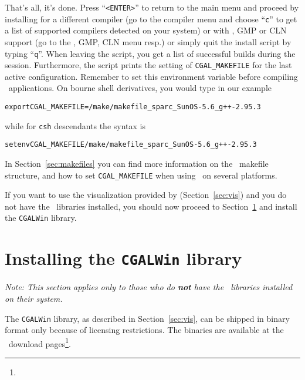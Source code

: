 That's all, it's done. Press ``\texttt{<ENTER>}'' to return to the
main menu and proceed by installing for a different compiler (go to
the compiler menu and choose ``\texttt{c}'' to get a list of supported
compilers detected on your system) or with \leda, GMP or CLN support
(go to the \leda, GMP, CLN menu resp.) or simply quit the install
script by typing ``\texttt{q}''. When leaving the script, you get a
list of successful builds during the session. Furthermore, the script
prints the setting of \texttt{CGAL\_MAKEFILE} for the last active
configuration. Remember to set this environment variable before
compiling \cgal\ applications. On bourne shell derivatives, you would
type in our example
\begin{alltt}
      export CGAL_MAKEFILE=\cgaldir/make/makefile_sparc_SunOS-5.6_g++-2.95.3
\end{alltt}
while for \texttt{csh} descendants the syntax is
\begin{alltt}
      setenv CGAL_MAKEFILE \cgaldir/make/makefile_sparc_SunOS-5.6_g++-2.95.3
\end{alltt}
In Section~\ref{sec:makefiles} you can find more information on the
\cgal\ makefile structure, and how to set \texttt{CGAL\_MAKEFILE} when
using \cgal\ on several platforms.

If you want to use the visualization provided by
 (Section~\ref{sec:vis}) and you do not have
the \leda\ libraries installed, you should now proceed to
Section~\ref{sec:cgalwin} and install the \texttt{CGALWin} library.


\section{Installing the \texttt{CGALWin} library}\label{sec:cgalwin}

\textit{Note: This section applies only to those who do \textbf{not}
  have the \leda\ libraries installed on their system.}

The \texttt{CGALWin} library, as described in Section~\ref{sec:vis},
can be shipped in binary format only because of licensing
restrictions. The binaries are available at the \cgal\ download
pages\footnote{\cgalwinlibpage}. 

